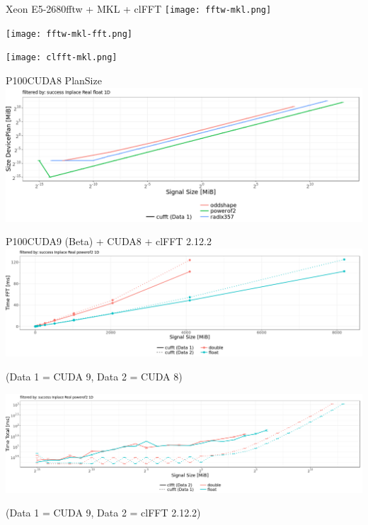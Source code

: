 \documentclass[t,11pt,hyperref={
  pdftitle = {gearshifft},
  pdfsubject = {gearshifft},
  pdfborder={0 0 0},
  colorlinks=true,
  urlcolor=red,
  citecolor=red,
  linkcolor=red,
  pdfauthor={Peter Steinbach, Matthias Werner}
  }
]{beamer}
\begin{document}
\begin{frame}{Xeon E5-2680}{fftw + MKL + clFFT}
\vspace{-0.5em} \hspace*{-2em}  \texttt{[image: fftw-mkl.png]}
  
\vspace{-2.1em} \hspace*{-2em}  \texttt{[image: fftw-mkl-fft.png]}

\vspace{-0.1em} \hspace*{-2em}  \texttt{[image: clfft-mkl.png]}
\end{frame}

\begin{frame}{P100}{CUDA8 PlanSize}
  \centering
  \hspace*{-2em}  \includegraphics[width=1.1\textwidth]{p100-cuda8-kind-plansize.png}
\end{frame}


\begin{frame}{P100}{CUDA9 (Beta) + CUDA8 + clFFT 2.12.2}
  \centering
  \hspace*{-2em}  \includegraphics[width=1.1\textwidth]{p100-cuda9-cuda8.png}
  
  {\scriptsize{(Data 1 = CUDA 9, Data 2 = CUDA 8)}}
  
  \hspace*{-2em}  \includegraphics[width=1.1\textwidth]{p100-clfft-cuda9.png}
  
  {\scriptsize{(Data 1 = CUDA 9, Data 2 = clFFT 2.12.2)}}
\end{frame}
\end{document}
